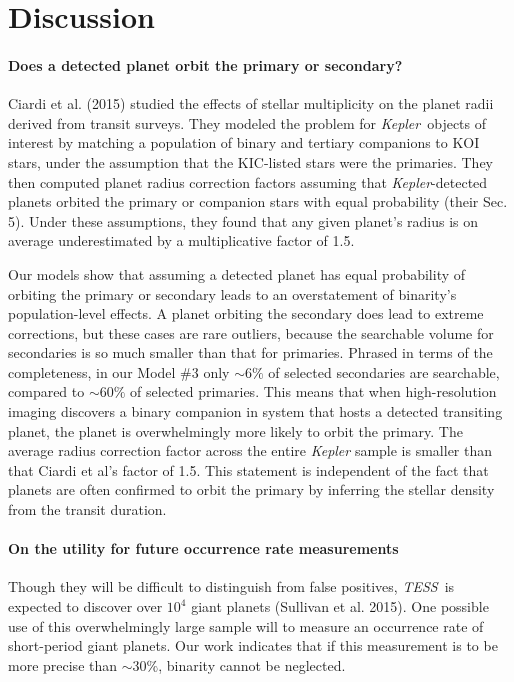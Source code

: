 \section{Discussion}
\label{sec:discussion}

\paragraph{Does a detected planet orbit the primary or secondary?}
Ciardi et al. (2015) studied the effects of stellar multiplicity on the 
planet radii derived from transit surveys.
They modeled the problem for {\it Kepler}\ objects of interest by matching a 
population of binary and tertiary companions to KOI stars, 
under the assumption that the KIC-listed stars were the primaries.
They then computed planet radius correction factors assuming that {\it 
Kepler}-detected planets orbited the primary or companion stars
with equal probability (their Sec. 5).
Under these assumptions, they found that any given planet's radius is on 
average underestimated by a multiplicative factor of 1.5.

Our models show that assuming a detected planet has equal probability of 
orbiting the primary or secondary leads to an overstatement of
binarity's population-level effects.
A planet orbiting the secondary does lead to extreme corrections, but these 
cases are rare outliers, because the searchable volume for secondaries is so 
much smaller than that for primaries.
Phrased in terms of the completeness, in our Model \#3 only $\sim 6\%$ of 
selected secondaries are searchable, compared to $\sim 60\%$ of selected 
primaries.
This means that when high-resolution imaging discovers a binary companion in 
system that hosts a detected transiting planet, the planet is overwhelmingly 
more likely to orbit the primary.
The average radius correction factor across the entire {\it Kepler} sample is 
smaller than that Ciardi et al's factor of 1.5.
This statement is independent of the fact that planets are often confirmed to 
orbit the primary by inferring the stellar density from the transit duration.

\paragraph{On the utility for future occurrence rate measurements}
Though they will be difficult to distinguish from false positives, {\it TESS}\ 
is expected to discover over $10^4$ giant planets (Sullivan et al. 2015).
One possible use of this overwhelmingly large sample will to measure an
occurrence rate of short-period giant planets.
Our work indicates that if this measurement is to be more precise than $\sim 
30\%$, binarity cannot be neglected.


